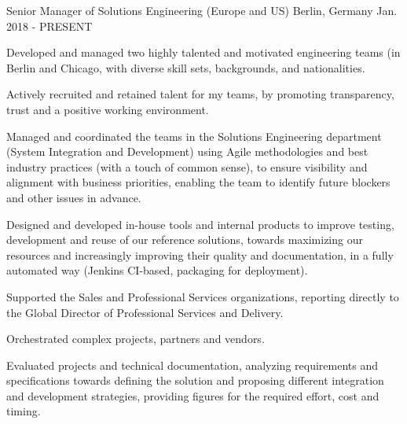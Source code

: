 



\begin{cventries}

  \cventry
    {Senior Manager of Solutions Engineering (Europe and US)} %
    {} %
    {Berlin, Germany} %
    {Jan. 2018 - PRESENT} %
    {
      \begin{cvitems} %
        \item {Developed and managed two highly talented and motivated engineering teams (in Berlin and Chicago, with diverse skill sets, backgrounds, and nationalities.}
        \item {Actively recruited and retained talent for my teams, by promoting transparency, trust and a positive working environment.}
        \item {Managed and coordinated the teams in the Solutions Engineering department (System Integration and Development) using Agile methodologies and best industry practices (with a touch of common sense), to ensure visibility and alignment with business priorities, enabling the team to identify future blockers and other issues in advance.}
        \item {Designed and developed in-house tools and internal products to improve testing, development and reuse of our reference solutions, towards maximizing our resources and increasingly improving their quality and documentation, in a fully automated way (Jenkins CI-based, packaging for deployment).}
        \item {Supported the Sales and Professional Services organizations, reporting directly to the Global Director of Professional Services and Delivery.}
        \item {Orchestrated complex projects, partners and vendors.}
        \item {Evaluated projects and technical documentation, analyzing requirements and specifications towards defining the solution and proposing different integration and development strategies, providing figures for the required effort, cost and timing.}

\end{cvitems}}
\end{cventries}
